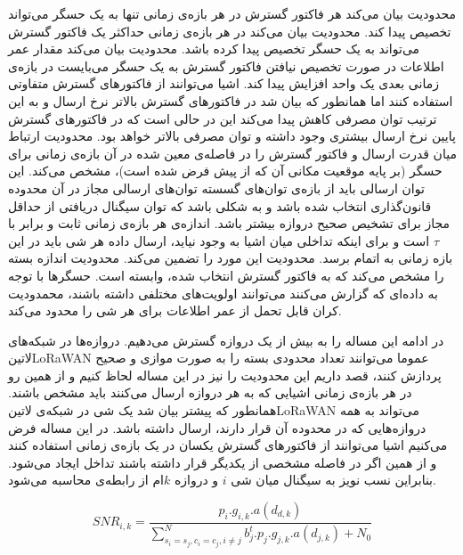 محدودیت  بیان می‌کند هر فاکتور گسترش در هر بازه‌ی زمانی تنها به یک حسگر می‌تواند تخصیص پیدا کند.
محدودیت  بیان می‌کند در هر بازه‌ی زمانی حداکثر یک فاکتور گسترش می‌تواند به یک حسگر تخصیص پیدا کرده باشد.
محدودیت  بیان می‌کند مقدار عمر اطلاعات در صورت تخصیص نیافتن فاکتور گسترش به یک حسگر می‌بایست در بازه‌ی زمانی بعدی یک واحد افزایش پیدا کند.
اشیا می‌توانند از فاکتورهای گسترش متفاوتی استفاده کنند اما همانطور که بیان شد در فاکتورهای گسترش بالاتر نرخ ارسال و به این ترتیب توان مصرفی کاهش پیدا می‌کند این در حالی است که
در فاکتورهای گسترش پایین نرخ ارسال بیشتری وجود داشته و توان مصرفی بالاتر خواهد بود. محدودیت  ارتباط میان قدرت ارسال و فاکتور گسترش را در فاصله‌ی
معین شده در آن بازه‌ی زمانی برای حسگر (بر پایه موقعیت مکانی آن که از پیش فرض شده است)، مشخص می‌کند.
این توان ارسالی باید از بازه‌ی توان‌های گسسته توان‌های ارسالی مجاز در آن محدوده قانون‌گذاری انتخاب شده باشد و به شکلی باشد که توان سیگنال دریافتی از حداقل مجاز برای تشخیص صحیح دروازه بیشتر باشد.
اندازه‌ی هر بازه‌ی زمانی ثابت و برابر با $\tau$ است و برای اینکه تداخلی میان اشیا به وجود نیاید، ارسال داده هر شی باید در این بازه زمانی به اتمام برسد.
محدودیت  این مورد را تضمین می‌کند.
محدودیت  اندازه بسته را مشخص می‌کند که به فاکتور گسترش انتخاب شده، وابسته است.
حسگرها با توجه به داده‌ای که گزارش می‌کنند می‌توانند اولویت‌های مختلفی داشته باشند، محمدودیت  کران قابل تحمل از عمر اطلاعات برای هر شی را محدود می‌کند.


در ادامه این مساله را به بیش از یک دروازه گسترش می‌دهیم. دروازه‌ها در شبکه‌های ‌لاتین{LoRaWAN} عموما می‌توانند تعداد محدودی بسته را به صورت موازی و صحیح پردازش کنند، قصد داریم این محدودیت را
نیز در این مساله لحاظ کنیم و از همین رو در هر بازه‌ی زمانی اشیایی که به هر دروازه ارسال می‌کنند باید مشخص باشند. همانطور که پیشتر بیان شد یک شی در شبکه‌ی ‌لاتین{LoRaWAN} می‌تواند به همه دروازه‌هایی
که در محدوده آن قرار دارند، ارسال داشته باشد.
در این مساله فرض می‌کنیم اشیا می‌توانند از فاکتورهای گسترش یکسان در یک بازه‌ی زمانی استفاده کنند و از همین اگر در فاصله مشخصی از یکدیگر قرار داشته باشند تداخل ایجاد می‌شود.
بنابراین نسب نویز به سیگنال میان شی $i$ و دروازه $k$ام از رابطه‌ی  محاسبه می‌شود.


\begin{equation}\label{eq:snr}
  SNR_{i, k} = \frac{p_i . g_{i,k} . a(d_{d,k})}{\sum_{s_i = s_j, c_i = c_j, i \neq j}^{N} b_{j}^{t} . p_{j} . g_{j,k} . a(d_{j,k}) + N_{0}}
\end{equation}
